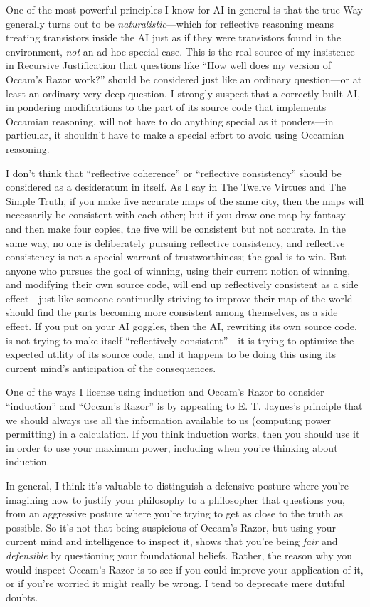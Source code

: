 {
 One of the most powerful principles I know for AI in general is
that the true Way generally turns out to be
\textit{naturalistic}{}---which for reflective reasoning means treating
transistors inside the AI just as if they were transistors found in the
environment, \textit{not} an ad-hoc special case. This is the real
source of my insistence in Recursive Justification that questions like
``How well does my version of Occam's
Razor work?'' should be considered just like an
ordinary question---or at least an ordinary very deep question. I
strongly suspect that a correctly built AI, in pondering modifications
to the part of its source code that implements Occamian reasoning, will
not have to do anything special as it ponders---in particular, it
shouldn't have to make a special effort to avoid using
Occamian reasoning.}

{
 I don't think that ``reflective
coherence'' or ``reflective
consistency'' should be considered as a desideratum
in itself. As I say in The Twelve Virtues and The Simple Truth, if you
make five accurate maps of the same city, then the maps will
necessarily be consistent with each other; but if you draw one map by
fantasy and then make four copies, the five will be consistent but not
accurate. In the same way, no one is deliberately pursuing reflective
consistency, and reflective consistency is not a special warrant of
trustworthiness; the goal is to win. But anyone who pursues the goal of
winning, using their current notion of winning, and modifying their own
source code, will end up reflectively consistent as a side
effect---just like someone continually striving to improve their map of
the world should find the parts becoming more consistent among
themselves, as a side effect. If you put on your AI goggles, then the
AI, rewriting its own source code, is not trying to make itself
``reflectively consistent''---it is
trying to optimize the expected utility of its source code, and it
happens to be doing this using its current mind's
anticipation of the consequences.}

{
 One of the ways I license using induction and
Occam's Razor to consider
``induction'' and
``Occam's Razor'' is
by appealing to E. T. Jaynes's principle that we should
always use all the information available to us (computing power
permitting) in a calculation. If you think induction works, then you
should use it in order to use your maximum power, including when
you're thinking about induction.}

{
 In general, I think it's valuable to distinguish a
defensive posture where you're imagining how to justify
your philosophy to a philosopher that questions you, from an aggressive
posture where you're trying to get as close to the
truth as possible. So it's not that being suspicious of
Occam's Razor, but using your current mind and
intelligence to inspect it, shows that you're being
\textit{fair} and \textit{defensible} by questioning your foundational
beliefs. Rather, the reason why you would inspect
Occam's Razor is to see if you could improve your
application of it, or if you're worried it might really
be wrong. I tend to deprecate mere dutiful doubts.}

